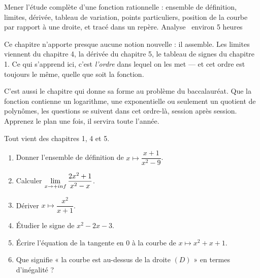   {Mener l'étude complète d'une fonction rationnelle : ensemble de
   définition, limites, dérivée, tableau de variation, points particuliers,
   position de la courbe par rapport à une droite, et tracé dans un repère.}
  {Analyse \textbullet\ environ 5 heures}

Ce chapitre n'apporte presque aucune notion nouvelle : il assemble. Les
limites viennent du chapitre 4, la dérivée du chapitre 5, le tableau de
signes du chapitre 1. Ce qui s'apprend ici, c'est \emph{l'ordre} dans lequel
on les met — et cet ordre est toujours le même, quelle que soit la fonction.

C'est aussi le chapitre qui donne sa forme au problème du baccalauréat. Que
la fonction contienne un logarithme, une exponentielle ou seulement un
quotient de polynômes, les questions se suivent dans cet ordre-là, session
après session. Apprenez le plan une fois, il servira toute l'année.

\begin{revision}
Tout vient des chapitres 1, 4 et 5.

\begin{enumerate}[label=\textbf{\arabic*.}, leftmargin=*, itemsep=0.35em]
  \item Donner l'ensemble de définition de $x \mapsto \dfrac{x+1}{x^{2}-9}$.
  \item Calculer $\limpinf \dfrac{2x^{2}+1}{x^{2}-x}$.
  \item Dériver $x \mapsto \dfrac{x^{2}}{x+1}$.
  \item Étudier le signe de $x^{2}-2x-3$.
  \item Écrire l'équation de la tangente en $0$ à la courbe de
        $x \mapsto x^{2}+x+1$.
  \item Que signifie « la courbe est au-dessus de la droite $(D)$ » en
        termes d'inégalité ?
\end{enumerate}
\end{revision}

